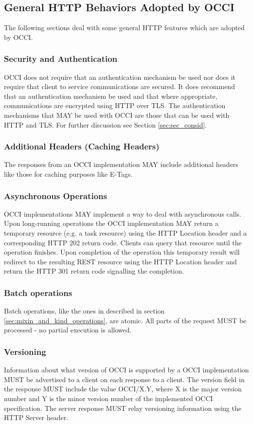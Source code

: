 \documentclass[10pt,a4paper]{article}
\begin{document}
\subsection{General HTTP Behaviors Adopted by OCCI}
The following sections deal with some general HTTP features which are
adopted by OCCI.

\subsubsection{Security and Authentication}
OCCI does not require that an authentication mechanism be used nor
does it require that client to service communications are secured. It
does recommend that an authentication mechanism be used and that where
appropriate, communications are encrypted using HTTP over TLS. The
authentication mechanisms that MAY be used with OCCI are those that
can be used with HTTP and TLS. For further discussion see Section
\ref{sec:sec_consid}.

\subsubsection{Additional Headers (Caching Headers)}
The responses from an OCCI implementation MAY include additional
headers like those for caching purposes like E-Tags.

\subsubsection{Asynchronous Operations}
\label{sec:async_ops}
OCCI implementations MAY implement a way to deal with asynchronous
calls. Upon long-running operations the OCCI implementation MAY return
a temporary resource (e.g. a task resource) using the HTTP Location
header and a corresponding HTTP 202 return code. Clients can query
that resource until the operation finishes. Upon completion of the
operation this temporary result will redirect to the resulting REST
resource using the HTTP Location header and return the HTTP 301
return code signalling the completion.

\subsubsection{Batch operations}
Batch operations, like the ones in described in section
\ref{sec:mixin_and_kind_operations}, are atomic. All parts of the
request MUST be processed - no partial execution is allowed.

\subsubsection{Versioning}
Information about what version of OCCI is supported by a OCCI
implementation MUST be advertised to a client on each response to a
client. The version field in the response MUST include the value
OCCI/X.Y, where X is the major version number and Y is the minor
version number of the implemented OCCI specification. The server 
response MUST relay versioning
information using the HTTP Server header.
\end{document}
